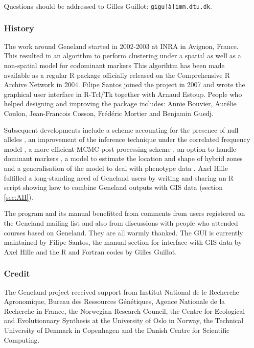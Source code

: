 \documentclass[a4paper,10pt]{article}
\begin{document}
Questions should be addressed to Gilles Guillot: \texttt{gigu[\`a]imm.dtu.dk}.


\subsubsection{History}
The work around {\sc Geneland} started in 2002-2003  at INRA in Avignon, France. 
This resulted in an algorithm to perform clustering under a spatial as well as a non-spatial model 
for codominant markers 
This algorihtm has been made available as a regular R package officially released on the Comprehensive R Archive Network in 2004. 
Filipe Santos joined the project in 2007 and wrote  the gra\-phical user interface in R-Tcl/Tk together with Arnaud Estoup.
People who helped designing and improving the package includes:  
Annie Bouvier, Aur\'elie Coulon, Jean-Francois Cosson, Fr\'ed\'eric Mortier and Benjamin Guedj. 


Subsequent developments include a scheme accounting for the presence of null alleles \citep{Guillot08a}, 
an improvement of the  inference technique under the correlated frequency model \citep{Guillot08b}, 
a more efficient MCMC post-processing scheme \citep{Guillot08b}, 
an option to handle dominant markers \citep{Guillot10b}, 
a model to estimate the location and shape of hybrid zones \citep{Guedj11} 
and a generalisation of the model to deal with phenotype data \citep{Guillot12a}.
Axel Hille fulfilled a long-standing need of Geneland users by writing and sharing an R script showing how to 
combine {\sc Geneland} outputs with GIS data (section \ref{sec:AH}).

The program and its manual benefitted from comments from users registered on the {\sc Geneland} mailing list and also 
from discussions with people who attended courses  based on {\sc Geneland}. 
They are all warmly thanked.
The GUI is currently maintained by Filipe Santos, the manual section for interface with GIS data by Axel Hille 
and the  R and Fortran codes  by Gilles Guillot. 

\subsubsection{Credit}
The {\sc Geneland} project received support from Institut National de le Recherche Agronomique, Bureau des Ressources G\'en\'etiques, 
Agence Nationale de la Recherche in France,  
the Norwegian Research Council, the Centre for Ecological and Evolutionnary Synthesis at the University of Oslo in Norway, 
the Technical University of Denmark in Copenhagen and the Danish Centre for Scientific Computing. 
\end{document}
